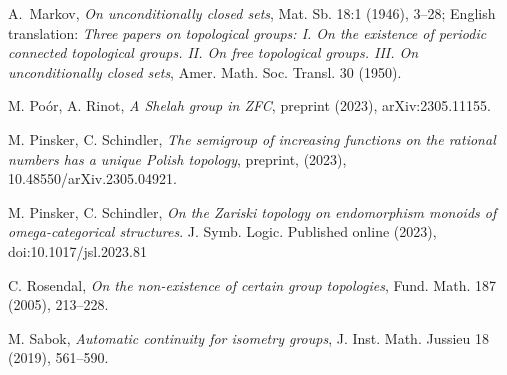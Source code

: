 \documentclass[11pt]{amsart}
\theoremstyle{definition}
\begin{document}
\begin{thebibliography}{}




  A.~Markov, {\em On unconditionally closed sets}, Mat. Sb. 18:1 (1946), 3--28; English translation: {\em Three papers on topological groups: I. On the existence of periodic connected topological groups. II. On free topological groups. III. On unconditionally closed sets}, Amer. Math. Soc. Transl. 30 (1950).



M. Poór, A. Rinot, {\em A Shelah group in ZFC}, preprint (2023), arXiv:2305.11155.






M. Pinsker, C. Schindler, {\em The semigroup of increasing functions on the rational numbers has a unique Polish topology}, preprint, (2023), 10.48550/arXiv.2305.04921.

M. Pinsker, C. Schindler, {\em On the Zariski topology on endomorphism monoids of omega-categorical structures}. J. Symb. Logic. Published online (2023),  doi:10.1017/jsl.2023.81



C. Rosendal, {\em On the non-existence of certain group topologies}, Fund. Math. 187 (2005), 213--228.


M. Sabok, {\em Automatic continuity for isometry groups}, J. Inst. Math. Jussieu 18 (2019), 561--590.


\end{thebibliography}
\end{document}
